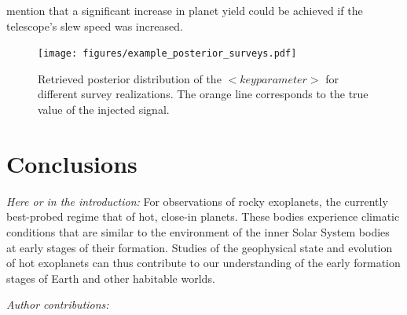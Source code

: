 \documentclass[modern]{aastex631}
\begin{document}
\begin{note}
    \citet{Penny2019} mention that a significant increase in planet yield could be achieved if the telescope's slew speed was increased.
\end{note}

\begin{figure}[ht!]
    \begin{centering}

        \texttt{[image: figures/example\_posterior\_surveys.pdf]}
        \caption{
        Retrieved posterior distribution of the $<key parameter>$ for different survey realizations.
        The orange line corresponds to the true value of the injected signal.
        }
        \label{fig:posterior_surveys}
    \end{centering}
\end{figure}



\section{Conclusions}

\begin{note}
    \textit{Here or in the introduction:} For observations of rocky exoplanets, the currently best-probed regime that of hot, close-in planets.
    These bodies experience climatic conditions that are similar to the environment of the inner Solar System bodies at early stages of their formation.
    Studies of the geophysical state and evolution of hot exoplanets can thus contribute to our understanding of the early formation stages of Earth and other habitable worlds.
\end{note}



\begin{large}\textit{Author contributions:}\end{large}





\end{document}
